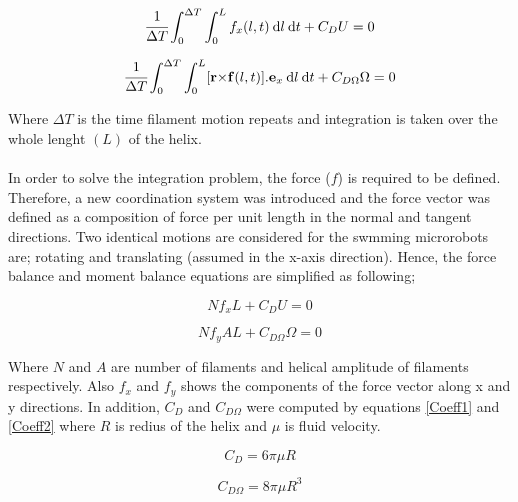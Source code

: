 \documentclass[12pt,a4paper,titlepage]{report}
\begin{document}
\begin{equation}
  \cfrac {1} {\Delta T} \int_0^{\Delta T} \int_0^L  f_x(l,t)\: \mathrm{d}l \:\mathrm{d}t + C_DU  = 0
\label{thrust}
\end{equation}

\begin{equation}
  \cfrac {1} {\Delta T}  \int_0^{\Delta T} \int_0^L [\bold r \bold \times \bold f(l,t)] . \bold e_x \: \mathrm{d}l \:\mathrm{d}t + C_{D\Omega}\Omega= 0
\label{torque}
\end{equation}

Where $\Delta T$ is the time filament motion repeats and integration is taken over the whole lenght $(L)$ of the
helix. 

\paragraph{}
In order to solve the integration problem, the force ($f$) is required to be defined. Therefore, a new
coordination system was introduced and the force vector was defined as a composition of force per unit length
in the normal and tangent directions. Two identical motions are considered for the swmming microrobots
are; rotating and translating (assumed in the x-axis direction). Hence, the force balance and moment balance 
equations are simplified as following; 


\begin{equation}
Nf_xL  + C_DU  = 0
\label{simple_thrust}
\end{equation}



\begin{equation}
 Nf_yAL + C_{D\Omega}\Omega= 0
\label{simple_torque}
\end{equation}

Where $N$ and $A$ are number of filaments and helical amplitude of filaments respectively. Also $f_x$ and 
$f_y$ shows the components of the force vector along x and y directions. In addition, $C_D$ and $C_{D\Omega}$
were computed by equations \ref{Coeff1} and \ref{Coeff2} where $R$ is redius of the helix and $\mu$ is fluid velocity.


\begin{equation}
 C_D  = 6 \pi \mu R
\label{Coeff1}
\end{equation}



\begin{equation}
 C_{D\Omega}= 8 \pi \mu R^3
\label{Coeff2}
\end{equation}
\end{document}
